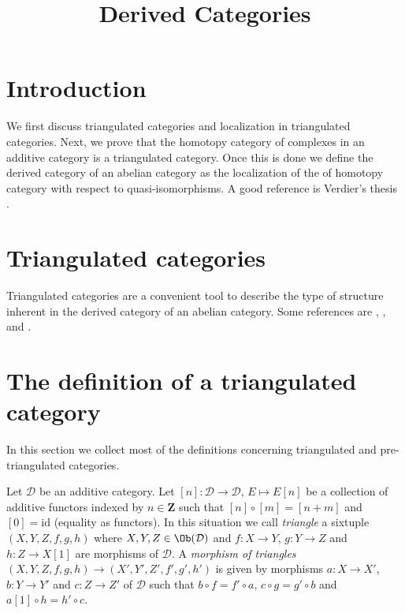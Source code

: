 

%


\title{Derived Categories}


\maketitle

\label{section-phantom}

\tableofcontents

\section{Introduction}
\label{section-introduction}

\noindent
We first discuss triangulated categories and localization in triangulated
categories. Next, we prove that the homotopy category of complexes in an
additive category is a triangulated category. Once this is done we define
the derived category of an abelian category as the localization of the
of homotopy category with respect to quasi-isomorphisms.
A good reference is Verdier's thesis \cite{Verdier}.



\section{Triangulated categories}
\label{section-triangulated-categories}

\noindent
Triangulated categories are a convenient tool to describe the type
of structure inherent in the derived category of an abelian category.
Some references are \cite{Verdier}, \cite{KS}, and \cite{Neeman}.




\section{The definition of a triangulated category}
\label{section-triangulated-definitions}

\noindent
In this section we collect most of the definitions concerning triangulated
and pre-triangulated categories.

\begin{definition}
\label{definition-triangle}
Let $\mathcal{D}$ be an additive category.
Let $[n] : \mathcal{D} \to \mathcal{D}$, $E \mapsto E[n]$
be a collection of additive functors indexed by $n \in \mathbf{Z}$ such that
$[n] \circ [m] = [n + m]$  and $[0] = \text{id}$ (equality as functors).
In this situation
we call {\it triangle} a sixtuple $(X, Y, Z, f, g, h)$
where $X, Y, Z \in \Ob(\mathcal{D})$ and
$f : X \to Y$, $g : Y \to Z$ and $h : Z \to X[1]$ are morphisms
of $\mathcal{D}$.
A {\it morphism of triangles}
$(X, Y, Z, f, g, h) \to (X', Y', Z', f', g', h')$
is given by morphisms $a : X \to X'$, $b : Y \to Y'$ and $c : Z \to Z'$
of $\mathcal{D}$ such that
$b \circ f = f' \circ a$, $c  \circ g = g' \circ b$ and
$a[1] \circ h = h' \circ c$.
\end{definition}

